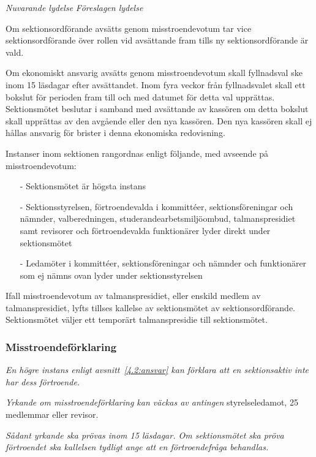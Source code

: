 \documentclass{article}
\newenvironment{lydelse}
    {\begin{paracol}{2}%
        \emph{Nuvarande lydelse}%
        \switchcolumn%
        \emph{Föreslagen lydelse}%
    \end{paracol}%
    \begin{enumerate}[label=\thesubsection.\arabic*]%
    \begin{paracol}{2}%
    }{\end{paracol}\end{enumerate}}
\begin{document}
\begin{lydelse}
  	\item Om sektionsordförande avsätts genom misstroendevotum tar vice sektionsordförande över rollen vid avsättande fram tills ny sektionsordförande är vald.

  	\item Om ekonomiskt ansvarig avsätts genom misstroendevotum skall fyllnadsval ske inom 15 läsdagar efter avsättandet. Inom fyra veckor från fyllnadsvalet skall ett bokslut för perioden fram till och med datumet för detta val upprättas. Sektionsmötet beslutar i samband med avsättande av kassören om detta bokslut skall upprättas av den avgående eller den nya kassören. Den nya kassören skall ej hållas  ansvarig för brister i denna ekonomiska redovisning. 

	\item Instanser inom sektionen rangordnas enligt följande, med avseende på misstroendevotum:
  	  \begin{itemize}
  	    \item[-] Sektionsmötet är högsta instans
  		\item[-] Sektionsstyrelsen, förtroendevalda i kommittéer, sektionsföreningar och nämnder, valberedningen, studerandearbetsmiljöombud, talmanspresidiet samt revisorer och förtroendevalda funktionärer lyder direkt under sektionsmötet
  		\item[-] Ledamöter i kommittéer, sektionsföreningar och nämnder och funktionärer som ej nämns ovan lyder under sektionsstyrelsen
  	  \end{itemize}
	
  	\item Ifall misstroendevotum av talmanspresidiet, eller enskild medlem av talmanspresidiet, lyfts tillses kallelse av sektionsmötet av sektionsordförande. Sektionsmötet väljer ett temporärt talmanspresidie till sektionsmötet.

  \switchcolumn
    \subsubsection*{Misstroendeförklaring}
    \item \emph{En högre instans enligt avsnitt~\ref{4.2:ansvar} kan förklara att en sektionsaktiv inte har dess förtroende.}

    \item \emph{Yrkande om misstroendeförklaring kan väckas av antingen} styrelseledamot, 25 medlemmar eller revisor.

    \item \emph{Sådant yrkande ska prövas inom 15 läsdagar.
    Om sektionsmötet ska pröva förtroendet ska kallelsen tydligt ange att en förtroendefråga behandlas.} \label{4.3:misstroende}


\end{lydelse}
\end{document}
